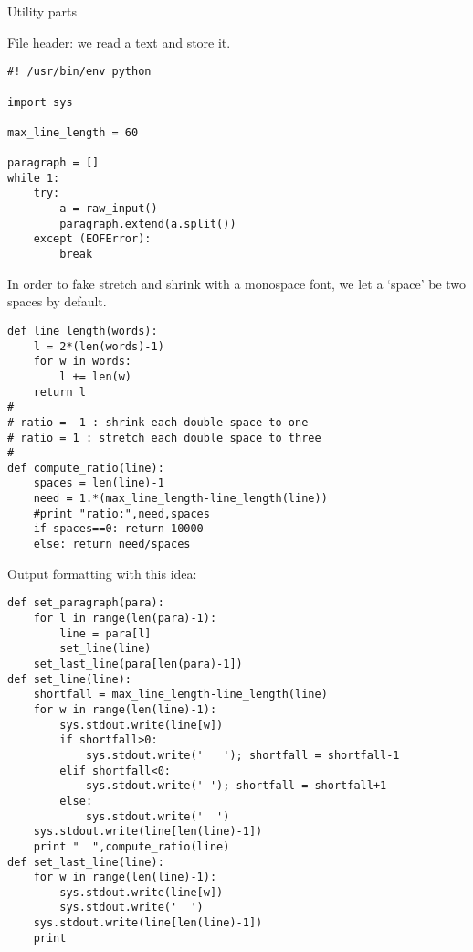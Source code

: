  {Utility parts}

File header: we read a text and store it.
\begin{verbatim}
#! /usr/bin/env python

import sys

max_line_length = 60

paragraph = []
while 1:
    try:
        a = raw_input()
        paragraph.extend(a.split())
    except (EOFError):
        break
\end{verbatim}

In order to fake stretch and shrink with a monospace font, we let a
`space' be two spaces by default.
\begin{verbatim}
def line_length(words):
    l = 2*(len(words)-1)
    for w in words:
        l += len(w)
    return l
#
# ratio = -1 : shrink each double space to one
# ratio = 1 : stretch each double space to three
#
def compute_ratio(line):
    spaces = len(line)-1
    need = 1.*(max_line_length-line_length(line))
    #print "ratio:",need,spaces
    if spaces==0: return 10000
    else: return need/spaces
\end{verbatim}
Output formatting with this idea:
\begin{verbatim}
def set_paragraph(para):
    for l in range(len(para)-1):
        line = para[l]
        set_line(line)
    set_last_line(para[len(para)-1])
def set_line(line):
    shortfall = max_line_length-line_length(line)
    for w in range(len(line)-1):
        sys.stdout.write(line[w])
        if shortfall>0:
            sys.stdout.write('   '); shortfall = shortfall-1
        elif shortfall<0:
            sys.stdout.write(' '); shortfall = shortfall+1
        else:
            sys.stdout.write('  ')
    sys.stdout.write(line[len(line)-1])
    print "  ",compute_ratio(line)
def set_last_line(line):
    for w in range(len(line)-1):
        sys.stdout.write(line[w])
        sys.stdout.write('  ')
    sys.stdout.write(line[len(line)-1])
    print
\end{verbatim}
